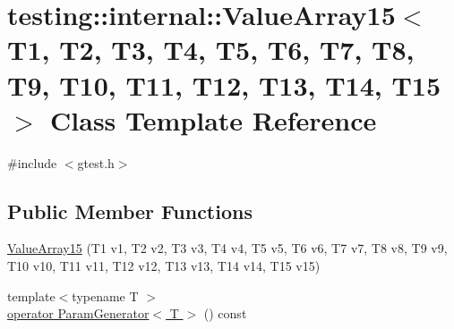 \hypertarget{classtesting_1_1internal_1_1_value_array15}{\section{testing\-:\-:internal\-:\-:Value\-Array15$<$ T1, T2, T3, T4, T5, T6, T7, T8, T9, T10, T11, T12, T13, T14, T15 $>$ Class Template Reference}
\label{classtesting_1_1internal_1_1_value_array15}
}


{\ttfamily \#include $<$gtest.\-h$>$}

\subsection*{Public Member Functions}
\begin{DoxyCompactItemize}
\item 
\hyperlink{classtesting_1_1internal_1_1_value_array15_a2f9c6670b744cb08587bea1b50e169b4}{Value\-Array15} (T1 v1, T2 v2, T3 v3, T4 v4, T5 v5, T6 v6, T7 v7, T8 v8, T9 v9, T10 v10, T11 v11, T12 v12, T13 v13, T14 v14, T15 v15)
\item 
{\footnotesize template$<$typename T $>$ }\\\hyperlink{classtesting_1_1internal_1_1_value_array15_ad0d51bef2fc25806e99a6d6ef386e836}{operator Param\-Generator$<$ T $>$} () const 
\end{DoxyCompactItemize}


